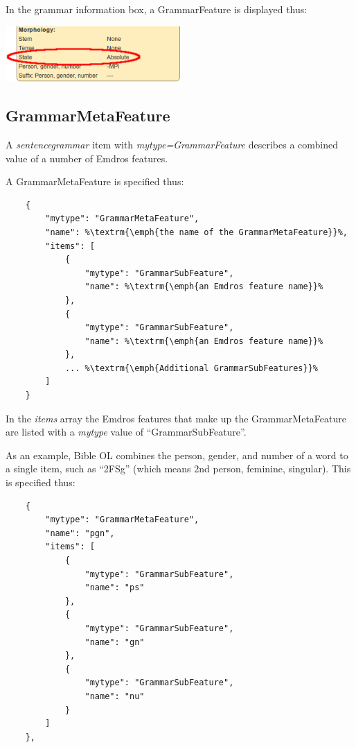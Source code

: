\documentclass[11pt,oneside,a4paper]{memoir}
\begin{document}
\Needspace*{5cm}%
In the grammar information box, a GrammarFeature is displayed thus:

\begin{center}
  \includegraphics[width=0.5\textwidth]{state2.png}
\end{center}


\subsection{GrammarMetaFeature}\label{sec-grammarmetafeature}

A \emph{sentencegrammar} item with \emph{mytype=GrammarFeature} describes a combined value of a
number of Emdros features.

A GrammarMetaFeature is specified thus:

\begin{lstlisting}
    {
        "mytype": "GrammarMetaFeature",
        "name": %\textrm{\emph{the name of the GrammarMetaFeature}}%,
        "items": [
            {
                "mytype": "GrammarSubFeature",
                "name": %\textrm{\emph{an Emdros feature name}}%
            },
            {
                "mytype": "GrammarSubFeature",
                "name": %\textrm{\emph{an Emdros feature name}}%
            },
            ... %\textrm{\emph{Additional GrammarSubFeatures}}%
        ]
    }
\end{lstlisting}

In the \emph{items} array the Emdros features that make up the GrammarMetaFeature are listed with a
\emph{mytype} value of ``GrammarSubFeature''.

As an example, Bible OL combines the person, gender, and number of a word to a single item, such as
``2FSg'' (which means 2nd person, feminine, singular). This is specified thus:

\begin{lstlisting}
    {
        "mytype": "GrammarMetaFeature",
        "name": "pgn",
        "items": [
            {
                "mytype": "GrammarSubFeature",
                "name": "ps"
            },
            {
                "mytype": "GrammarSubFeature",
                "name": "gn"
            },
            {
                "mytype": "GrammarSubFeature",
                "name": "nu"
            }
        ]
    },
\end{lstlisting}
\end{document}
